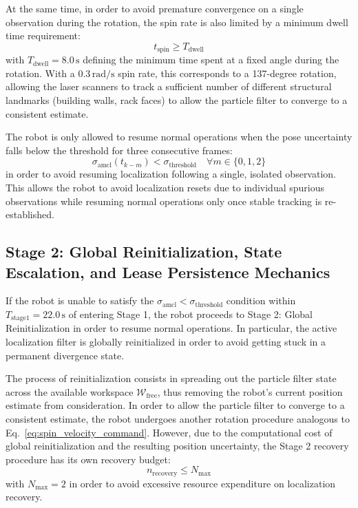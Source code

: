 At the same time, in order to avoid premature convergence on a single observation during the rotation, the spin rate is also limited by a minimum dwell time requirement:
\begin{equation} t_{\text{spin}} \ge T_{\text{dwell}} \label{eq:dwell_time_constraint} \end{equation}
with $T_{\text{dwell}} = 8.0\,\text{s}$ defining the minimum time spent at a fixed angle during the rotation. With a $0.3\,\text{rad/s}$ spin rate, this corresponds to a 137-degree rotation, allowing the laser scanners to track a sufficient number of different structural landmarks (building walls, rack faces) to allow the particle filter to converge to a consistent estimate.

The robot is only allowed to resume normal operations when the pose uncertainty falls below the threshold for three consecutive frames:
\begin{equation} \sigma_{\text{amcl}}(t_{k - m}) < \sigma_{\text{threshold}} \quad \forall m \in \{0, 1, 2\} \label{eq:stable_exit_condition} \end{equation}
in order to avoid resuming localization following a single, isolated observation. This allows the robot to avoid localization resets due to individual spurious observations while resuming normal operations only once stable tracking is re-established.

\subsection{Stage 2: Global Reinitialization, State Escalation, and Lease Persistence Mechanics}

If the robot is unable to satisfy the $\sigma_{\text{amcl}} < \sigma_{\text{threshold}}$ condition within $T_{\text{stage1}} = 22.0\,\text{s}$ of entering Stage 1, the robot proceeds to Stage 2: Global Reinitialization in order to resume normal operations. In particular, the active localization filter is globally reinitialized in order to avoid getting stuck in a permanent divergence state.

The process of reinitialization consists in spreading out the particle filter state across the available workspace $\mathcal{W}_{\text{free}}$, thus removing the robot's current position estimate from consideration. In order to allow the particle filter to converge to a consistent estimate, the robot undergoes another rotation procedure analogous to Eq.~\ref{eq:spin_velocity_command}. However, due to the computational cost of global reinitialization and the resulting position uncertainty, the Stage 2 recovery procedure has its own recovery budget:
\begin{equation} n_{\text{recovery}} \le N_{\text{max}} \label{eq:recovery_attempts_limit} \end{equation}
with $N_{\text{max}} = 2$ in order to avoid excessive resource expenditure on localization recovery.

